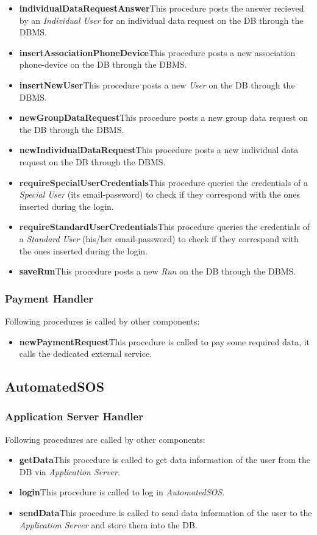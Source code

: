 \begin{itemize}
  \item \textbf{individualDataRequestAnswer}\quad This procedure posts the answer recieved by an \textit{Individual User} for an individual data request on the DB through the DBMS.
  \item \textbf{insertAssociationPhoneDevice}\quad This procedure posts a new association phone-device on the DB through the DBMS.
  \item \textbf{insertNewUser}\quad This procedure posts a new \textit{User} on the DB through the DBMS.
  \item \textbf{newGroupDataRequest}\quad This procedure posts a new group data request on the DB through the DBMS.
  \item \textbf{newIndividualDataRequest}\quad This procedure posts a new individual data request on the DB through the DBMS.
  \item \textbf{requireSpecialUserCredentials}\quad This procedure queries the credentials of a \textit{Special User} (its email-password) to check if they correspond with the ones inserted during the login.
  \item \textbf{requireStandardUserCredentials}\quad This procedure queries the credentials of a \textit{Standard User} (his/her email-password) to check if they correspond with the ones inserted during the login.
  \item \textbf{saveRun}\quad This procedure posts a new \textit{Run} on the DB through the DBMS.
\end{itemize}

\subsubsection{Payment Handler}
Following procedures is called by other components:
\begin{itemize}
  \item \textbf{newPaymentRequest}\quad This procedure is called to pay some required data, it calls the dedicated external service.
\end{itemize}

\subsection{AutomatedSOS}
\subsubsection{Application Server Handler}
Following procedures are called by other components:
\begin{itemize}
  \item \textbf{getData}\quad This procedure is called to get data information of the user from the DB via \textit{Application Server}.
  \item \textbf{login}\quad This procedure is called to log in \textit{AutomatedSOS}.
  \item \textbf{sendData}\quad This procedure is called to send data information of the user to the \textit{Application Server} and store them into the DB.
\end{itemize}

